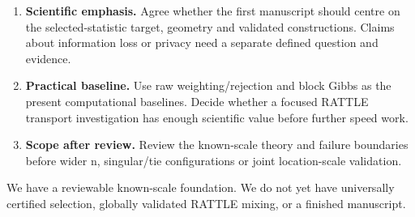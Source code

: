 \documentclass[
  10pt,
]{article}
\providecommand{\tightlist}{%
  \setlength{\itemsep}{0pt}\setlength{\parskip}{0pt}}
\begin{document}
\begin{enumerate}
\def\labelenumi{\arabic{enumi}.}
\tightlist
\item
  \textbf{Scientific emphasis.} Agree whether the first manuscript
  should centre on the selected-statistic target, geometry and validated
  constructions. Claims about information loss or privacy need a
  separate defined question and evidence.
\item
  \textbf{Practical baseline.} Use raw weighting/rejection and block
  Gibbs as the present computational baselines. Decide whether a focused
  RATTLE transport investigation has enough scientific value before
  further speed work.
\item
  \textbf{Scope after review.} Review the known-scale theory and failure
  boundaries before wider n, singular/tie configurations or joint
  location-scale validation.
\end{enumerate}

We have a reviewable known-scale foundation. We do not yet have
universally certified selection, globally validated RATTLE mixing, or a
finished manuscript.
\end{document}
